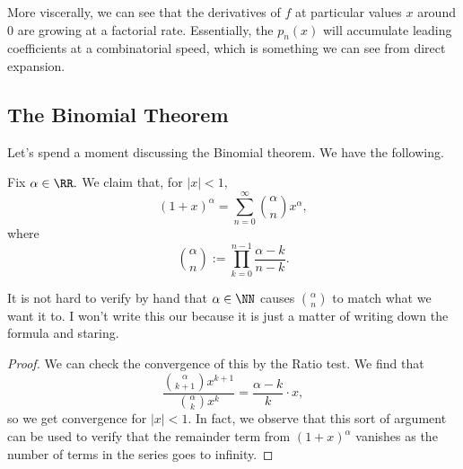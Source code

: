 \documentclass[../notes.tex]{subfiles}
\begin{document}
\begin{remark}
	More viscerally, we can see that the derivatives of $f$ at particular values $x$ around $0$ are growing at a factorial rate. Essentially, the $p_n(x)$ will accumulate leading coefficients at a combinatorial speed, which is something we can see from direct expansion.
\end{remark}

\subsection{The Binomial Theorem}
Let's spend a moment discussing the Binomial theorem. We have the following.
\begin{proposition}
	Fix $\alpha\in\RR.$ We claim that, for $|x|<1,$
	\[(1+x)^\alpha=\sum_{n=0}^\infty\binom\alpha n x^\alpha,\]
	where
	\[\binom\alpha n:=\prod_{k=0}^{n-1}\frac{\alpha-k}{n-k}.\]
\end{proposition}
\begin{remark}
	It is not hard to verify by hand that $\alpha\in\NN$ causes $\binom\alpha n$ to match what we want it to. I won't write this our because it is just a matter of writing down the formula and staring.
\end{remark}
\begin{proof}
	We can check the convergence of this by the Ratio test. We find that
	\[\frac{\binom\alpha{k+1}x^{k+1}}{\binom\alpha kx^k}=\frac{\alpha-k}k\cdot x,\]
	so we get convergence for $|x|<1.$ In fact, we observe that this sort of argument can be used to verify that the remainder term from $(1+x)^\alpha$ vanishes as the number of terms in the series goes to infinity.
\end{proof}
\end{document}
